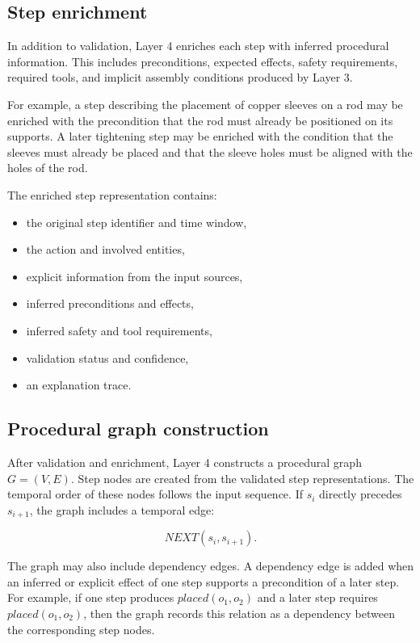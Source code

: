 \subsection{Step enrichment}

In addition to validation, Layer 4 enriches each step with inferred procedural information. This includes preconditions, expected effects, safety requirements, required tools, and implicit assembly conditions produced by Layer 3.

For example, a step describing the placement of copper sleeves on a rod may be enriched with the precondition that the rod must already be positioned on its supports. A later tightening step may be enriched with the condition that the sleeves must already be placed and that the sleeve holes must be aligned with the holes of the rod.

The enriched step representation contains:

\begin{itemize}
    \item the original step identifier and time window,
    \item the action and involved entities,
    \item explicit information from the input sources,
    \item inferred preconditions and effects,
    \item inferred safety and tool requirements,
    \item validation status and confidence,
    \item an explanation trace.
\end{itemize}

\subsection{Procedural graph construction}

After validation and enrichment, Layer 4 constructs a procedural graph $G = (V,E)$. Step nodes are created from the validated step representations. The temporal order of these nodes follows the input sequence. If $s_i$ directly precedes $s_{i+1}$, the graph includes a temporal edge:

\[
NEXT(s_i,s_{i+1}).
\]

The graph may also include dependency edges. A dependency edge is added when an inferred or explicit effect of one step supports a precondition of a later step. For example, if one step produces $placed(o_1,o_2)$ and a later step requires $placed(o_1,o_2)$, then the graph records this relation as a dependency between the corresponding step nodes.

